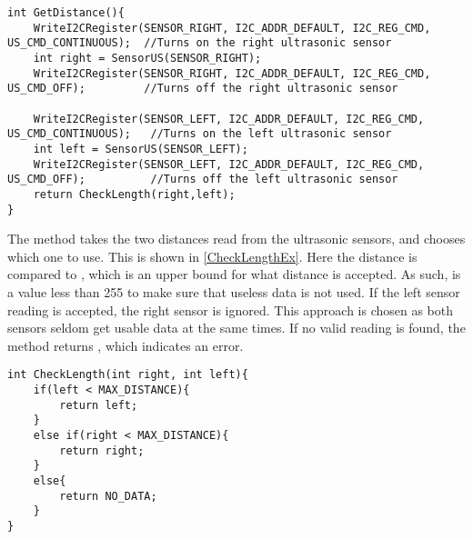 \begin{minipage}[H]{\linewidth}
\begin{lstlisting}[caption = Method for reading the distance from the ultrasonic distance sensors., label = GetDistanceFunc] 
int GetDistance(){
    WriteI2CRegister(SENSOR_RIGHT, I2C_ADDR_DEFAULT, I2C_REG_CMD, US_CMD_CONTINUOUS);  //Turns on the right ultrasonic sensor
    int right = SensorUS(SENSOR_RIGHT);
    WriteI2CRegister(SENSOR_RIGHT, I2C_ADDR_DEFAULT, I2C_REG_CMD, US_CMD_OFF);         //Turns off the right ultrasonic sensor

    WriteI2CRegister(SENSOR_LEFT, I2C_ADDR_DEFAULT, I2C_REG_CMD, US_CMD_CONTINUOUS);   //Turns on the left ultrasonic sensor
    int left = SensorUS(SENSOR_LEFT);
    WriteI2CRegister(SENSOR_LEFT, I2C_ADDR_DEFAULT, I2C_REG_CMD, US_CMD_OFF);          //Turns off the left ultrasonic sensor
    return CheckLength(right,left);
}
\end{lstlisting}
\end{minipage}

The  method takes the two distances read from the ultrasonic
sensors, and chooses which one to use. This is shown in \autoref{CheckLengthEx}.
Here the distance is compared to , which is an upper bound
for what distance is accepted. As such,  is a value less
than 255 to make sure that useless data is not used. If the left sensor reading
is accepted, the right sensor is ignored. This approach is chosen as both
sensors seldom get usable data at the same times. If no valid reading is found,
the method returns , which indicates an error.\nl

\begin{minipage}[H]{\linewidth}
\begin{lstlisting}[caption = \texttt{CheckLength} method which chooses the best
input distance., label = CheckLengthEx] 
int CheckLength(int right, int left){
    if(left < MAX_DISTANCE){
        return left;
    }
    else if(right < MAX_DISTANCE){
        return right;
    }
    else{
        return NO_DATA;
    }
}
\end{lstlisting}
\end{minipage}
